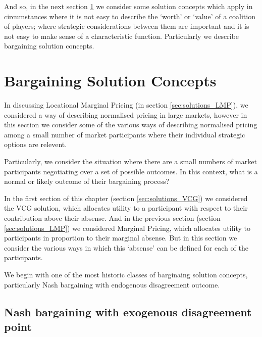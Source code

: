 And so, in the next section \ref{sec:solutions_bargaining} we consider some solution concepts which apply in circumstances where it is not easy to describe the `worth' or `value' of a coalition of players; where strategic considerations between them are important and it is not easy to make sense of a characteristic function.
Particularly we describe bargaining solution concepts.


\section{Bargaining Solution Concepts}\label{sec:solutions_bargaining}

In discussing Locational Marginal Pricing (in section \ref{sec:solutions_LMP}), we considered a way of describing normalised pricing in large markets, however in this section we consider some of the various ways of describing normalised pricing among a small number of market participants where their individual strategic options are relevent.

Particularly, we consider the situation where there are a small numbers of market participants negotiating over a set of possible outcomes.
In this context, what is a normal or likely outcome of their bargaining process?

In the first section of this chapter (section \ref{sec:solutions_VCG}) we considered the VCG solution, which allocates utility to a participant with respect to their contribution above their absense.
And in the previous section (section \ref{sec:solutions_LMP}) we considered Marginal Pricing, which allocates utility to participants in proportion to their marginal absense.
But in this section we consider the various ways in which this `absense' can be defined for each of the participants.

We begin with one of the most historic classes of barginaing solution concepts, particularly Nash bargaining with endogenous disagreement outcome.

\subsection{Nash bargaining with exogenous disagreement point}\label{sec:nash_bargaining_exogenous}




